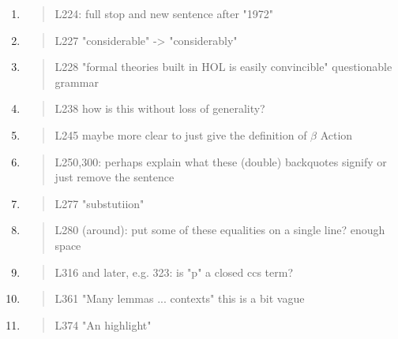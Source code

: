 \begin{enumerate}
\item \begin{quote}
    L224: full stop and new sentence after "1972"
  \end{quote}

\item \begin{quote}
    L227 "considerable" -> "considerably"
  \end{quote}

\item \begin{quote}
    L228 "formal theories built in HOL is easily convincible" questionable grammar
  \end{quote}

\item \begin{quote}
    L238 how is this without loss of generality?
  \end{quote}

\item \begin{quote}
    L245 maybe more clear to just give the definition of $\beta$ Action 
  \end{quote}

\item \begin{quote}
    L250,300: perhaps explain what these (double) backquotes signify or just remove the sentence
  \end{quote}

\item \begin{quote}
    L277 "substutiion"
  \end{quote}

\item \begin{quote}
    L280 (around): put some of these equalities on a single line? enough space
  \end{quote}

\item \begin{quote}
    L316 and later, e.g. 323: is "p" a closed ccs term?
  \end{quote}

\item \begin{quote}
    L361 "Many lemmas ... contexts" this is a bit vague
  \end{quote}

\item \begin{quote}
    L374 "An highlight"
  \end{quote}


\end{enumerate}
